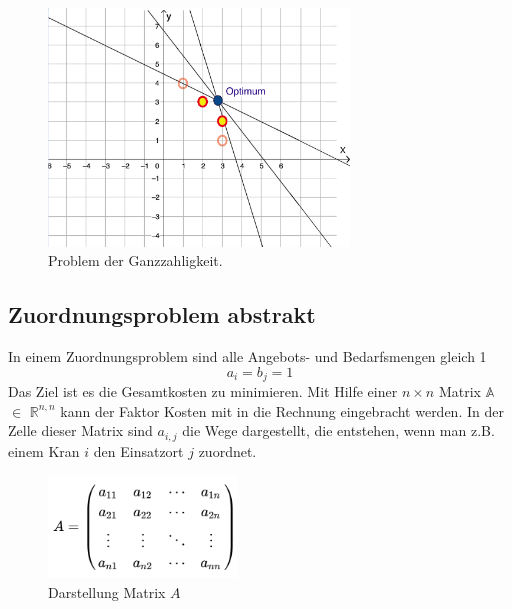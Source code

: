 \begin{figure}
\centering
\includegraphics[width=8cm]{papers/munkres/figures/ganzzahlige_punkte}
\caption{Problem der Ganzzahligkeit.}
\label{munkres:Vr2}
\end{figure}


\subsection{Zuordnungsproblem abstrakt
\label{munkres:subsection:bonorum}}

In einem Zuordnungsproblem sind alle Angebots- und Bedarfsmengen gleich 1 
\begin{equation}
a_{i}=b_{j}=1
\end{equation}
Das Ziel ist es die Gesamtkosten zu minimieren. Mit Hilfe einer $n\times n$ Matrix $\mathbb{A}$ $\mathbb{\in}$ $\mathbb{R}^{n,n}$ kann der Faktor Kosten mit in die Rechnung eingebracht werden.
In der Zelle dieser Matrix sind $a_{i,j}$ die Wege dargestellt, die entstehen, wenn man z.B. einem Kran $i$ den Einsatzort $j$ zuordnet.

\begin{figure}
\centering
\includegraphics[width=5cm]{papers/munkres/figures/MatrixA.png}
\caption{Darstellung Matrix $A$}
\label{munkres:Vr2}
\end{figure}


